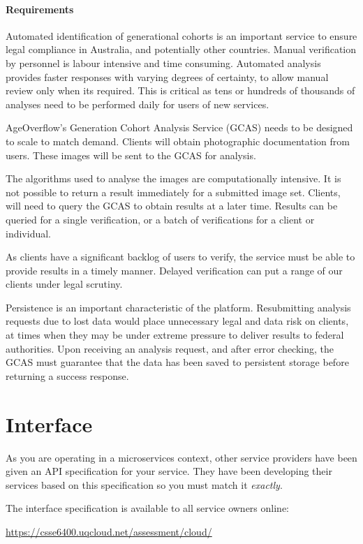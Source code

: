 \documentclass{csse4400}
\begin{document}
\paragraph{Requirements}
Automated identification of generational cohorts is an important service to ensure legal compliance in Australia,
and potentially other countries.
Manual verification by personnel is labour intensive and time consuming.
Automated analysis provides faster responses with varying degrees of certainty, to allow manual review only when its required.
This is critical as tens or hundreds of thousands of analyses need to be performed daily for users of new services.

AgeOverflow's Generation Cohort Analysis Service (GCAS) needs to be designed to scale to match demand.
Clients will obtain photographic documentation from users.
These images will be sent to the GCAS for analysis.

The algorithms used to analyse the images are computationally intensive.
It is not possible to return a result immediately for a submitted image set.
Clients, will need to query the GCAS to obtain results at a later time.
Results can be queried for a single verification, or a batch of verifications for a client or individual.

As clients have a significant backlog of users to verify,
the service must be able to provide results in a timely manner.
Delayed verification can put a range of our clients under legal scrutiny.

Persistence is an important characteristic of the platform.
Resubmitting analysis requests due to lost data would place unnecessary legal and data risk on clients,
at times when they may be under extreme pressure to deliver results to federal authorities.
Upon receiving an analysis request, and after error checking,
the GCAS must guarantee that the data has been saved to persistent storage before returning a success response.


\section{Interface}
As you are operating in a microservices context,
other service providers have been given an API specification for your service.
They have been developing their services based on this specification so you must match it \emph{exactly}.

The interface specification is available to all service owners online: 

\url{https://csse6400.uqcloud.net/assessment/cloud/}
\end{document}
